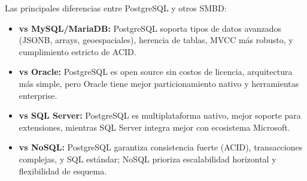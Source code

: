 Las principales diferencias entre PostgreSQL y otros SMBD:

\begin{itemize}
    \item \textbf{vs MySQL/MariaDB:} PostgreSQL soporta tipos de datos avanzados (JSONB, arrays, geoespaciales), herencia de tablas, MVCC más robusto, y cumplimiento estricto de ACID.
    \item \textbf{vs Oracle:} PostgreSQL es open source sin costos de licencia, arquitectura más simple, pero Oracle tiene mejor particionamiento nativo y herramientas enterprise.
    \item \textbf{vs SQL Server:} PostgreSQL es multiplataforma nativo, mejor soporte para extensiones, mientras SQL Server integra mejor con ecosistema Microsoft.
    \item \textbf{vs NoSQL:} PostgreSQL garantiza consistencia fuerte (ACID), transacciones complejas, y SQL estándar; NoSQL prioriza escalabilidad horizontal y flexibilidad de esquema.
\end{itemize}